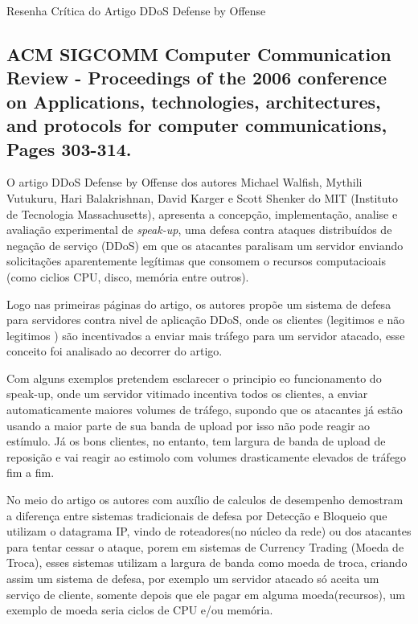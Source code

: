 \documentclass[a4paper,12pt]{article}
\begin{document}
\LARGE
Resenha Crítica do Artigo DDoS Defense by Offense
\large

\subsection*{
	 ACM SIGCOMM  Computer Communication Review - Proceedings of the 2006 conference on Applications, technologies, architectures, and protocols for computer communications, Pages 303-314.
}

\vspace{0.3cm}

 O artigo DDoS Defense by Offense \cite{Walfish:2006:DDO:1151659.1159948} dos autores Michael Walfish, Mythili Vutukuru, Hari Balakrishnan, David Karger  e  Scott Shenker do MIT (Instituto de Tecnologia Massachusetts), apresenta a concepção, implementação, analise e avaliação experimental de \textit{speak-up}, uma defesa contra ataques distribuídos de negação de serviço (DDoS) em que os atacantes paralisam um servidor enviando solicitações aparentemente legítimas que consomem o recursos computacioais (como ciclios CPU, disco, memória entre outros).


\vspace{0.3cm}

 Logo nas primeiras páginas do artigo, os autores propõe um sistema de defesa para servidores contra nivel de aplicação DDoS, onde os clientes (legitimos e não legitimos ) são incentivados a enviar mais tráfego para um servidor atacado, esse conceito foi analisado ao decorrer do artigo.

\vspace{0.3cm}
Com alguns exemplos pretendem esclarecer o principio eo funcionamento do speak-up, onde um servidor vitimado incentiva todos os clientes, a enviar automaticamente maiores volumes de tráfego, supondo que os atacantes já estão usando a maior parte de sua banda de upload por isso não pode reagir ao estímulo. Já os bons clientes, no entanto, tem largura de banda de upload de reposição e vai reagir ao estimolo com volumes drasticamente elevados de tráfego fim a fim.

\vspace{0.3cm}

No meio do artigo os autores com auxílio de calculos de desempenho demostram  a diferença entre sistemas tradicionais de defesa por Detecção e Bloqueio que utilizam o datagrama IP, vindo de roteadores(no núcleo da rede) ou dos atacantes para tentar cessar o ataque, porem em sistemas de Currency Trading (Moeda de Troca), esses sistemas utilizam a largura de banda como moeda de troca, criando assim um sistema de defesa, por exemplo um servidor atacado só aceita um serviço de cliente, somente depois que ele pagar em alguma moeda(recursos), um exemplo de moeda seria ciclos de CPU e/ou memória. 
\end{document}
